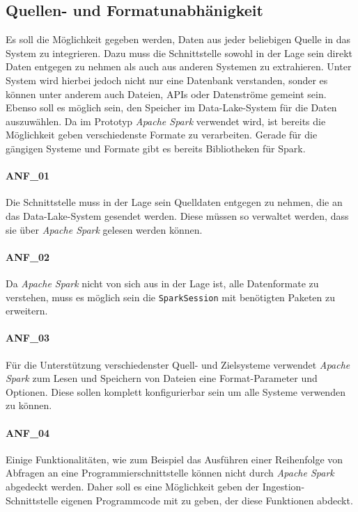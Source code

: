 \subsection{Quellen- und Formatunabhänigkeit}
Es soll die Möglichkeit gegeben werden, Daten aus jeder beliebigen Quelle in das System zu integrieren.
Dazu muss die Schnittstelle sowohl in der Lage sein direkt Daten entgegen zu nehmen als auch aus anderen Systemen zu extrahieren.
Unter System wird hierbei jedoch nicht nur eine Datenbank verstanden, sonder es können unter anderem auch Dateien, APIs oder Datenströme gemeint sein.
Ebenso soll es möglich sein, den Speicher im Data-Lake-System für die Daten auszuwählen.
Da im Prototyp \textit{Apache Spark} verwendet wird, ist bereits die Möglichkeit geben verschiedenste Formate zu verarbeiten.
Gerade für die gängigen Systeme und Formate gibt es bereits Bibliotheken für Spark.


\paragraph{ANF\_01}
\label{ANF_01}
Die Schnittstelle muss in der Lage sein Quelldaten entgegen zu nehmen, die an das Data-Lake-System gesendet werden.
Diese müssen so verwaltet werden, dass sie über \textit{Apache Spark} gelesen werden können.

\paragraph{ANF\_02}
\label{ANF_02}
Da \textit{Apache Spark} nicht von sich aus in der Lage ist, alle Datenformate zu verstehen, muss es möglich sein die \verb|SparkSession| mit benötigten Paketen zu erweitern.

\paragraph{ANF\_03}
\label{ANF_03}
Für die Unterstützung verschiedenster Quell- und Zielsysteme verwendet \textit{Apache Spark} zum Lesen und Speichern von Dateien eine Format-Parameter und Optionen.
Diese sollen komplett konfigurierbar sein um alle Systeme verwenden zu können.

\paragraph{ANF\_04}
\label{ANF_04}
Einige Funktionalitäten, wie zum Beispiel das Ausführen einer Reihenfolge von Abfragen an eine Programmierschnittstelle können nicht durch \textit{Apache Spark} abgedeckt werden.
Daher soll es eine Möglichkeit geben der Ingestion-Schnittstelle eigenen Programmcode mit zu geben, der diese Funktionen abdeckt.

